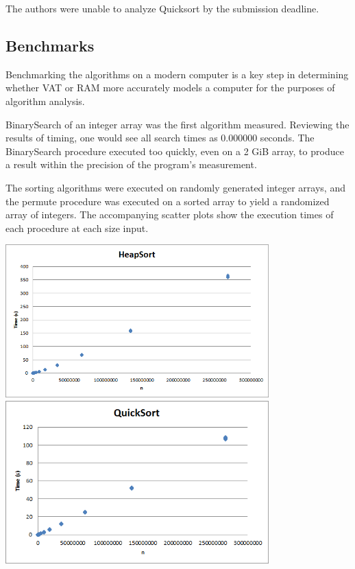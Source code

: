     The authors were unable to analyze Quicksort by the submission deadline.
  
  \subsection{Benchmarks}
    Benchmarking the algorithms on a modern computer is a key step in
    determining whether VAT or RAM more accurately models a computer for the
    purposes of algorithm analysis.
    
    BinarySearch of an integer array was the first algorithm measured.
    Reviewing the results of timing, one would see all search times as 0.000000
    seconds. The BinarySearch procedure executed too quickly, even on a 2 GiB
    array, to produce a result within the precision of the program's
    measurement.
   
    The sorting algorithms were executed on randomly generated integer arrays,
    and the permute procedure was executed on a sorted array to yield a
    randomized array of integers. The accompanying scatter plots show the
    execution times of each procedure at each size input.
   
   \begin{center}
    \includegraphics[width=4in]{heapsort.png}\\
    \includegraphics[width=4in]{quicksort.png}
   \end{center}
   
